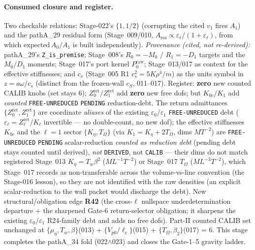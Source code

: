 \paragraph{Consumed closure and register.}
Two checkable relations: Stage-022's \(\{1,1/2\}\) (corrupting the cited \(v_1\) fires \(A_1\)) and the pathA\_29 residual form
(Stage~009/010, \(A_{\mathrm{res}}\propto\varepsilon_\ell/(1+\varepsilon_\ell)\), from which \(\mathrm{expected}\,A_0/A_1\) is
built independently). \emph{Provenance (cited, not re-derived):} pathA\_29's \texttt{Z\_is\_premise}; Stage~008's \(R_0=-M_0\) /
\(R_1=-D_1\) targets and the \(M_0/D_1\) moments; Stage~017's port kernel \(P_0^{\mathrm{raw}}\); Stage~013/017 as context for the
effective stiffnesses; and \(c_s\) (Stage~005 R1 \(c_s^2=5K\rho^4/m\)) as the units symbol in \(z=a\omega/c_s\) (distinct from the
frozen-wall \(c_S\), 011--017). Register: \textbf{zero} new counted CALIB knobs (set stays 6); \(Z_0^{\mathrm{ret}}/Z_1^{\mathrm{ret}}\)
add \textbf{zero} new free dofs; but \(K_{0c}/K_1\) add \emph{counted} \texttt{FREE-UNREDUCED} \texttt{PENDING} reduction-debt. The return admittances
\(\{Z_0^{\mathrm{ret}},Z_1^{\mathrm{ret}}\}\) are coordinate \emph{aliases} of the existing \(\varepsilon_0/\varepsilon_1\)
\texttt{FREE-UNREDUCED} debt (\(\varepsilon_\ell=Z_\ell^{\mathrm{ret}}/K_\ell\) invertible --- no double-count, no new dof); the effective
stiffnesses \(K_{0c}\) and the \(\ell=1\) sector \(\{K_\eta,T_\Omega\}\) (via \(K_1=K_\eta+2T_\Omega\), dims \(M T^{-2}\)) are
\texttt{FREE-UNREDUCED} \texttt{PENDING} scalar-reduction \emph{counted as reduction debt} (pending debt stays counted until derived), \emph{not} \texttt{DERIVED}, not \texttt{CALIB}
--- their dims do not match registered Stage~013 \(K_\eta=T_w\beta^2\) (\(M L^{-1}T^{-2}\)) or Stage~017 \(T_\Omega\)
(\(M L^{-3}T^{-2}\)), which Stage~017 records as non-transferable across the volume-vs-line convention (the Stage-016 lesson), so
they are not identified with the raw densities (an explicit scalar-reduction to the wall packet would discharge the debt). New structural/obligation edge \textbf{R42} (the cross-\(\ell\) nullspace
underdetermination departure + the sharpened Gate-6 return-selector obligation; it sharpens the existing \(\varepsilon_0/\varepsilon_1\)
R24-family debt and adds no free dofs). Part-II counted CALIB set unchanged at \(\{\mu_\eta,T_w,\beta\}\)(013) +
\(\{V_{p0}/\ell_c\}\)(015) + \(\{T_\Omega,\beta_2\}\)(017) = 6. This stage completes the pathA\_34 fold (022\(\wedge\)023) and
closes the Gate-1--5 gravity ladder.

